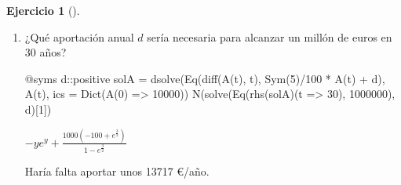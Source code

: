 \documentclass[
  spanish,
  a4paper,
]{scrreport}
\newenvironment{Shaded}{\begin{snugshade}}{\end{snugshade}}
\newcommand{\DataTypeTok}[1]{\textcolor[rgb]{0.68,0.00,0.00}{#1}}
\newcommand{\FloatTok}[1]{\textcolor[rgb]{0.68,0.00,0.00}{#1}}
\newcommand{\FunctionTok}[1]{\textcolor[rgb]{0.28,0.35,0.67}{#1}}
\newcommand{\NormalTok}[1]{\textcolor[rgb]{0.00,0.23,0.31}{#1}}
\newcommand{\OperatorTok}[1]{\textcolor[rgb]{0.37,0.37,0.37}{#1}}
\newcommand{\PreprocessorTok}[1]{\textcolor[rgb]{0.68,0.00,0.00}{#1}}
\theoremstyle{definition}
\newtheorem{exercise}{Ejercicio}[chapter]
\theoremstyle{remark}
\begin{document}
\begin{exercise}[]
\begin{enumerate}
\begin{tcolorbox}
  $A{\left(t \right)} = 130000 e^{\frac{t}{20}} - 120000$

  Es decir, \(A(t) = 130\,000\,e^{0.05t} - 120\,000\). A los 30 años:

\begin{Shaded}
\begin{Highlighting}[]
\FunctionTok{N}\NormalTok{(}\FunctionTok{rhs}\NormalTok{(sol)(}\FloatTok{30}\NormalTok{))}
\end{Highlighting}
\end{Shaded}

  $- y e^{y} - 240000 + 260000 e^{\frac{3}{2}}$

  El capital final es de unos 462.620 €, de los que 190.000 € son
  aportaciones y unos 272.600 € son intereses: más de la mitad del
  capital procede de la capitalización compuesta.

  \end{tcolorbox}
\item
  ¿Qué aportación anual \(d\) sería necesaria para alcanzar un millón de
  euros en 30 años?

  \begin{tcolorbox}[enhanced jigsaw, arc=.35mm, bottomrule=.15mm, bottomtitle=1mm, breakable, colback=white, colbacktitle=quarto-callout-tip-color!10!white, colframe=quarto-callout-tip-color-frame, coltitle=black, left=2mm, leftrule=.75mm, opacityback=0, opacitybacktitle=0.6, rightrule=.15mm, title=\textcolor{quarto-callout-tip-color}{\faLightbulb}\hspace{0.5em}{Solución}, titlerule=0mm, toprule=.15mm, toptitle=1mm]

\begin{Shaded}
\begin{Highlighting}[]
\PreprocessorTok{@syms}\NormalTok{ d}\OperatorTok{::}\DataTypeTok{positive}
\NormalTok{solA }\OperatorTok{=} \FunctionTok{dsolve}\NormalTok{(}\FunctionTok{Eq}\NormalTok{(}\FunctionTok{diff}\NormalTok{(}\FunctionTok{A}\NormalTok{(t), t), }\FunctionTok{Sym}\NormalTok{(}\FloatTok{5}\NormalTok{)}\OperatorTok{/}\FloatTok{100} \OperatorTok{*} \FunctionTok{A}\NormalTok{(t) }\OperatorTok{+}\NormalTok{ d), }\FunctionTok{A}\NormalTok{(t), ics }\OperatorTok{=} \FunctionTok{Dict}\NormalTok{(}\FunctionTok{A}\NormalTok{(}\FloatTok{0}\NormalTok{) }\OperatorTok{=\textgreater{}} \FloatTok{10000}\NormalTok{))}
\FunctionTok{N}\NormalTok{(}\FunctionTok{solve}\NormalTok{(}\FunctionTok{Eq}\NormalTok{(}\FunctionTok{rhs}\NormalTok{(solA)(t }\OperatorTok{=\textgreater{}} \FloatTok{30}\NormalTok{), }\FloatTok{1000000}\NormalTok{), d)[}\FloatTok{1}\NormalTok{])}
\end{Highlighting}
\end{Shaded}

  $- y e^{y} + \frac{1000 \left(-100 + e^{\frac{3}{2}}\right)}{1 - e^{\frac{3}{2}}}$

  Haría falta aportar unos 13717 €/año.

  \end{tcolorbox}
\end{enumerate}

\end{exercise}
\end{document}

